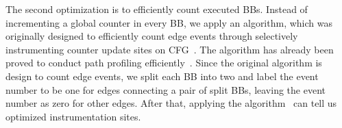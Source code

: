 The second optimization is to efficiently count executed BBs.
Instead of incrementing a global counter in every BB,
we apply an algorithm, which was originally designed to efficiently 
count edge events through selectively instrumenting counter update sites 
on CFG~\cite{event-counting}.
The algorithm has already been proved to conduct path 
profiling efficiently~\cite{path-profiling,peter-ase}.  
Since the original algorithm is design to count edge events, 
we split each BB into two and label the event number to be one for 
edges connecting a pair of split BBs, 
leaving the event number as zero for other edges. 
After that, applying the algorithm~\cite{event-counting}
can tell us optimized instrumentation sites. 



